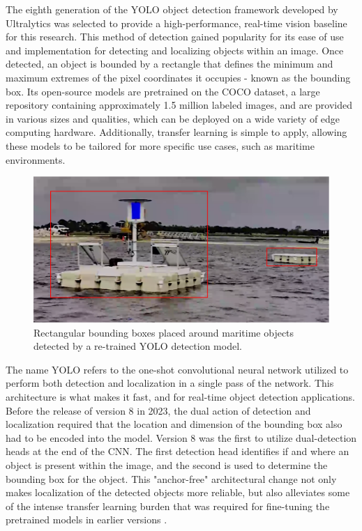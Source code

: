 \documentclass[../main.tex]{subfiles}
\begin{document}
The eighth generation of the \ac{YOLO} object detection framework developed by Ultralytics was selected to provide a high-performance, real-time vision baseline for this research. 
This method of detection gained popularity for its ease of use and implementation for detecting and localizing objects within an image.
Once detected, an object is bounded by a rectangle that defines the minimum and maximum extremes of the pixel coordinates it occupies - known as the bounding box.
Its open-source models are pretrained on the COCO dataset, a large repository containing approximately 1.5 million labeled images, and are provided in various sizes and qualities, which can be deployed on a wide variety of edge computing hardware.
Additionally, transfer learning is simple to apply, allowing these models to be tailored for more specific use cases, such as maritime environments.

\begin{figure}
    \centering
    \includegraphics[width=0.75\linewidth]{Images/YOLO_ex1.png}
    \caption{Rectangular bounding boxes placed around maritime objects detected by a re-trained YOLO detection model.}
    \label{fig:YOLO_tower}
\end{figure}

The name YOLO refers to the one-shot convolutional neural network utilized to perform both detection and localization in a single pass of the network.
This architecture is what makes it fast, and for real-time object detection applications. 
Before the release of version 8 in 2023, the dual action of detection and localization required that the location and dimension of the bounding box also had to be encoded into the model.
Version 8 was the first to utilize dual-detection heads at the end of the CNN.
The first detection head identifies if and where an object is present within the image, and the second is used to determine the bounding box for the object.
This "anchor-free" architectural change not only makes localization of the detected objects more reliable, but also alleviates some of the intense transfer learning burden that was required for fine-tuning the pretrained models in earlier versions \cite{ultralytics}.
\end{document}
